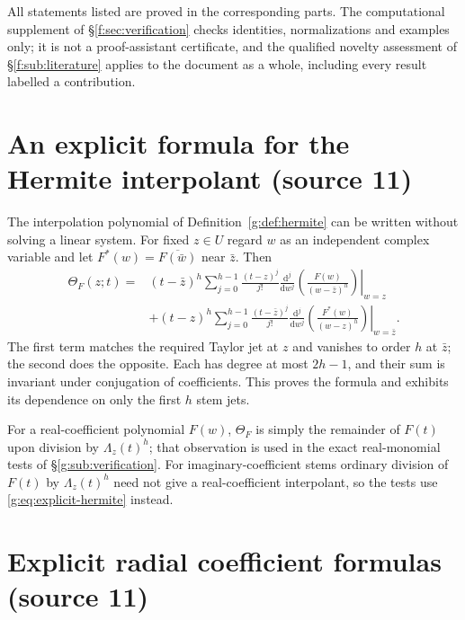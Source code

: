 \documentclass[11pt,a4paper]{article}
\numberwithin{equation}{section}
\theoremstyle{definition}
\theoremstyle{remark}
\theoremstyle{plain}
\newcommand{\dd}{\mathrm d}
\newcommand{\Herm}{\Theta}                        %
\newcommand{\Rq}{\Lambda}                         %
\begin{document}
All statements listed are proved in the corresponding parts. The
computational supplement of \S\ref{f:sec:verification} checks identities,
normalizations and examples only; it is not a proof-assistant certificate,
and the qualified novelty assessment of \S\ref{f:sub:literature} applies to
the document as a whole, including every result labelled a contribution.

\section{An explicit formula for the Hermite interpolant (source 11)}
\label{g:app:hermite}

The interpolation polynomial of Definition~\ref{g:def:hermite} can be written
without solving a linear system. For fixed $z\in U$ regard $w$ as an
independent complex variable and let $F^*(w)=\overline{F(\bar w)}$ near $\bar z$.
Then
\begin{equation}\label{g:eq:explicit-hermite}
\begin{split}
 \Herm_F(z;t)={}&(t-\bar z)^h\sum_{j=0}^{h-1}\frac{(t-z)^j}{j!}
 \left.\frac{\dd^j}{\dd w^j}\left(\frac{F(w)}{(w-\bar z)^h}\right)\right|_{w=z}\\
 &+(t-z)^h\sum_{j=0}^{h-1}\frac{(t-\bar z)^j}{j!}
 \left.\frac{\dd^j}{\dd w^j}\left(\frac{F^*(w)}{(w-z)^h}\right)\right|_{w=\bar z}.
\end{split}
\end{equation}
The first term matches the required Taylor jet at $z$ and vanishes to order
$h$ at $\bar z$; the second does the opposite. Each has degree at most $2h-1$,
and their sum is invariant under conjugation of coefficients. This proves the
formula and exhibits its dependence on only the first $h$ stem jets.

For a real-coefficient polynomial $F(w)$, $\Herm_F$ is simply the remainder of
$F(t)$ upon division by $\Rq_z(t)^h$; that observation is used in the exact
real-monomial tests of \S\ref{g:sub:verification}. For imaginary-coefficient
stems ordinary division of $F(t)$ by $\Rq_z(t)^h$ need not give a
real-coefficient interpolant, so the tests use \eqref{g:eq:explicit-hermite}
instead.

\section{Explicit radial coefficient formulas (source 11)}
\label{g:app:radial}
\end{document}
